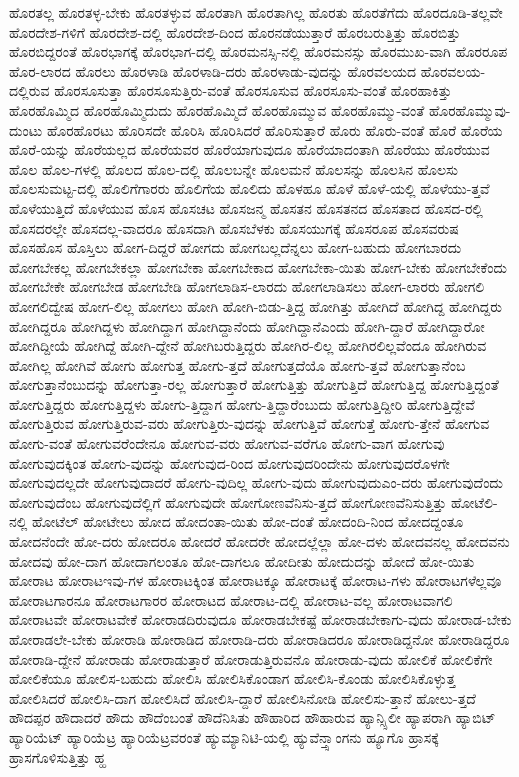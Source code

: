 {ಹೊರತಲ್ಲ
ಹೊರತಳ್ಳ-ಬೇಕು
ಹೊರತಳ್ಳುವ
ಹೊರತಾಗಿ
ಹೊರತಾಗಿಲ್ಲ
ಹೊರತು
ಹೊರತೆಗೆದು
ಹೊರದೂಡಿ-ತಲ್ಲವೇ
ಹೊರದೇಶ-ಗಳಿಗೆ
ಹೊರದೇಶ-ದಲ್ಲಿ
ಹೊರದೇಶ-ದಿಂದ
ಹೊರನಡೆಯುತ್ತಾರೆ
ಹೊರಬರುತ್ತಿತ್ತು
ಹೊರಬಿತ್ತು
ಹೊರಬಿದ್ದರಂತೆ
ಹೊರಭಾಗಕ್ಕೆ
ಹೊರಭಾಗ-ದಲ್ಲಿ
ಹೊರಮನಸ್ಸಿ-ನಲ್ಲಿ
ಹೊರಮನಸ್ಸು
ಹೊರಮುಖ-ವಾಗಿ
ಹೊರರೂಪ
ಹೊರ-ಲಾರದ
ಹೊರಲು
ಹೊರಳಾಡಿ
ಹೊರಳಾಡಿ-ದರು
ಹೊರಳಾಡು-ವುದನ್ನು
ಹೊರವಲಯದ
ಹೊರವಲಯ-ದಲ್ಲಿರುವ
ಹೊರಸೂಸುತ್ತಾ
ಹೊರಸೂಸುತ್ತಿರು-ವಂತೆ
ಹೊರಸೂಸುವ
ಹೊರಸೂಸು-ವಂತೆ
ಹೊರಹಾಕಿತ್ತು
ಹೊರಹೊಮ್ಮಿದ
ಹೊರಹೊಮ್ಮಿದುದು
ಹೊರಹೊಮ್ಮಿದೆ
ಹೊರಹೊಮ್ಮುವ
ಹೊರಹೊಮ್ಮು-ವಂತೆ
ಹೊರಹೊಮ್ಮುವು-ದುಂಟು
ಹೊರಹೊರಟು
ಹೊರಿಸದೇ
ಹೊರಿಸಿ
ಹೊರಿಸಿದರೆ
ಹೊರಿಸುತ್ತಾರೆ
ಹೊರು
ಹೊರು-ವಂತೆ
ಹೊರೆ
ಹೊರೆಯ
ಹೊರೆ-ಯನ್ನು
ಹೊರೆಯಲ್ಲದ
ಹೊರೆಯವರ
ಹೊರೆಯಾಗುವುದೂ
ಹೊರೆಯಾದಂತಾಗಿ
ಹೊರೆಯು
ಹೊರೆಯುವ
ಹೊಲ
ಹೊಲ-ಗಳಲ್ಲಿ
ಹೊಲದ
ಹೊಲ-ದಲ್ಲಿ
ಹೊಲಬನ್ನೇ
ಹೊಲಮನೆ
ಹೊಲಸನ್ನು
ಹೊಲಸಿನ
ಹೊಲಸು
ಹೊಲಸುಮಟ್ಟ-ದಲ್ಲಿ
ಹೊಲಿಗೆಗಾರರು
ಹೊಲಿಗೆಯ
ಹೊಲಿದು
ಹೊಳಹೂ
ಹೊಳೆ
ಹೊಳೆ-ಯಲ್ಲಿ
ಹೊಳೆಯು-ತ್ತವೆ
ಹೊಳೆಯುತ್ತಿದೆ
ಹೊಳೆಯುವ
ಹೊಸ
ಹೊಸಚಟ
ಹೊಸಜನ್ಮ
ಹೊಸತನ
ಹೊಸತನದ
ಹೊಸತಾದ
ಹೊಸದ-ರಲ್ಲಿ
ಹೊಸದರಲ್ಲೇ
ಹೊಸದಲ್ಲ-ವಾದರೂ
ಹೊಸದಾಗಿ
ಹೊಸಬೆಳಕು
ಹೊಸಯುಗಕ್ಕೆ
ಹೊಸರೂಪ
ಹೊಸವರುಷ
ಹೊಸಹೊಸ
ಹೊಸ್ತಿಲು
ಹೋಗ-ದಿದ್ದರೆ
ಹೋಗದು
ಹೋಗಬಲ್ಲದೆನ್ನಲು
ಹೋಗ-ಬಹುದು
ಹೋಗಬಾರದು
ಹೋಗಬೇಕಲ್ಲ
ಹೋಗಬೇಕಲ್ಲಾ
ಹೋಗಬೇಕಾ
ಹೋಗಬೇಕಾದ
ಹೋಗಬೇಕಾ-ಯಿತು
ಹೋಗ-ಬೇಕು
ಹೋಗಬೇಕೆಂದು
ಹೋಗಬೇಕೇ
ಹೋಗಬೇಡ
ಹೋಗಬೇಡಿ
ಹೋಗಲಾಡಿಸ-ಲಾರದು
ಹೋಗಲಾಡಿಸಲು
ಹೋಗ-ಲಾರರು
ಹೋಗಲಿ
ಹೋಗಲಿದ್ವೇಷ
ಹೋಗ-ಲಿಲ್ಲ
ಹೋಗಲು
ಹೋಗಿ
ಹೋಗಿ-ಬಿಡು-ತ್ತಿದ್ದ
ಹೋಗಿತ್ತು
ಹೋಗಿದೆ
ಹೋಗಿದ್ದ
ಹೋಗಿದ್ದರು
ಹೋಗಿದ್ದರೂ
ಹೋಗಿದ್ದಳು
ಹೋಗಿದ್ದಾಗ
ಹೋಗಿದ್ದಾನೆಂದು
ಹೋಗಿದ್ದಾನೆಎಂದು
ಹೋಗಿ-ದ್ದಾರೆ
ಹೋಗಿದ್ದಾರೋ
ಹೋಗಿದ್ದೀಯೆ
ಹೋಗಿದ್ದೆ
ಹೋಗಿ-ದ್ದೇನೆ
ಹೋಗಿಬರುತ್ತಿದ್ದರು
ಹೋಗಿರ-ಲಿಲ್ಲ
ಹೋಗಿರಲಿಲ್ಲವೆಂದೂ
ಹೋಗಿರುವ
ಹೋಗಿಲ್ಲ
ಹೋಗಿವೆ
ಹೋಗು
ಹೋಗುತ್ತ
ಹೋಗು-ತ್ತದೆ
ಹೋಗುತ್ತದೆಯೊ
ಹೋಗು-ತ್ತವೆ
ಹೋಗುತ್ತಾನೆಂಬ
ಹೋಗುತ್ತಾನೆಂಬುದನ್ನು
ಹೋಗುತ್ತಾ-ರಲ್ಲ
ಹೋಗುತ್ತಾರೆ
ಹೋಗುತ್ತಿತ್ತು
ಹೋಗುತ್ತಿದೆ
ಹೋಗುತ್ತಿದ್ದ
ಹೋಗುತ್ತಿದ್ದಂತೆ
ಹೋಗುತ್ತಿದ್ದರು
ಹೋಗುತ್ತಿದ್ದಳು
ಹೋಗು-ತ್ತಿದ್ದಾಗ
ಹೋಗು-ತ್ತಿದ್ದಾರೆಂಬುದು
ಹೋಗುತ್ತಿದ್ದೀರಿ
ಹೋಗುತ್ತಿದ್ದೇವೆ
ಹೋಗುತ್ತಿರುವ
ಹೋಗುತ್ತಿರುವ-ವರು
ಹೋಗುತ್ತಿರು-ವುದನ್ನು
ಹೋಗುತ್ತಿವೆ
ಹೋಗುತ್ತೆ
ಹೋಗು-ತ್ತೇನೆ
ಹೋಗುವ
ಹೋಗು-ವಂತೆ
ಹೋಗುವರೆಂದೇನೂ
ಹೋಗುವ-ವರು
ಹೋಗುವ-ವರೆಗೂ
ಹೋಗು-ವಾಗ
ಹೋಗುವು
ಹೋಗುವುದಕ್ಕಿಂತ
ಹೋಗು-ವುದನ್ನು
ಹೋಗುವುದ-ರಿಂದ
ಹೋಗುವುದರಿಂದೇನು
ಹೋಗುವುದರೊಳಗೇ
ಹೋಗುವುದಲ್ಲದೇ
ಹೋಗುವುದಾದರೆ
ಹೋಗು-ವುದಿಲ್ಲ
ಹೋಗು-ವುದು
ಹೋಗುವುದುಎಂ-ದರು
ಹೋಗುವುದೆಂದು
ಹೋಗುವುದೆಂಬ
ಹೋಗುವುದೆಲ್ಲಿಗೆ
ಹೋಗುವುದೇ
ಹೋಗೋಣವೆನಿಸು-ತ್ತದೆ
ಹೋಗೋಣವೆನಿಸುತ್ತಿತ್ತು
ಹೋಟೆಲಿ-ನಲ್ಲಿ
ಹೋಟೆಲ್
ಹೋಟೇಲು
ಹೋದ
ಹೋದಂತಾ-ಯಿತು
ಹೋ-ದಂತೆ
ಹೋದಂದಿ-ನಿಂದ
ಹೋದದ್ದಂತೂ
ಹೋದನೆಂದೇ
ಹೋ-ದರು
ಹೋದರೂ
ಹೋದರೆ
ಹೋದರೇ
ಹೋದಲ್ಲೆಲ್ಲಾ
ಹೋ-ದಳು
ಹೋದವನಲ್ಲ
ಹೋದವನು
ಹೋದವು
ಹೋ-ದಾಗ
ಹೋದಾಗಲಂತೂ
ಹೋ-ದಾಗಲೂ
ಹೋದೀತು
ಹೋದುದನ್ನು
ಹೋದೆ
ಹೋ-ಯಿತು
ಹೋರಾಟ
ಹೋರಾಟಇವು-ಗಳ
ಹೋರಾಟಕ್ಕಿಂತ
ಹೋರಾಟಕ್ಕೂ
ಹೋರಾಟಕ್ಕೆ
ಹೋರಾಟ-ಗಳು
ಹೋರಾಟಗಳೆಲ್ಲವೂ
ಹೋರಾಟಗಾರನೂ
ಹೋರಾಟಗಾರರ
ಹೋರಾಟದ
ಹೋರಾಟ-ದಲ್ಲಿ
ಹೋರಾಟ-ವಲ್ಲ
ಹೋರಾಟವಾಗಲಿ
ಹೋರಾಟವೇ
ಹೋರಾಟವೇಕೆ
ಹೋರಾಡದಿರುವುದೂ
ಹೋರಾಡಬೇಕಷ್ಟೆ
ಹೋರಾಡಬೇಕಾಗು-ವುದು
ಹೋರಾಡ-ಬೇಕು
ಹೋರಾಡಲೇ-ಬೇಕು
ಹೋರಾಡಿ
ಹೋರಾಡಿದ
ಹೋರಾಡಿ-ದರು
ಹೋರಾಡಿದರೂ
ಹೋರಾಡಿದ್ದನೋ
ಹೋರಾಡಿದ್ದರೂ
ಹೋರಾಡಿ-ದ್ದೇನೆ
ಹೋರಾಡು
ಹೋರಾಡುತ್ತಾರೆ
ಹೋರಾಡುತ್ತಿರುವನೊ
ಹೋರಾಡು-ವುದು
ಹೋಲಿಕೆ
ಹೋಲಿಕೆಗೇ
ಹೋಲಿಕೆಯೂ
ಹೋಲಿಸ-ಬಹುದು
ಹೋಲಿಸಿ
ಹೋಲಿಸಿಕೊಂಡಾಗ
ಹೋಲಿಸಿ-ಕೊಂಡು
ಹೋಲಿಸಿಕೊಳ್ಳುತ್ತ
ಹೋಲಿಸಿದರೆ
ಹೋಲಿಸಿ-ದಾಗ
ಹೋಲಿಸಿದೆ
ಹೋಲಿಸಿ-ದ್ದಾರೆ
ಹೋಲಿಸಿನೋಡಿ
ಹೋಲಿಸು-ತ್ತಾನೆ
ಹೋಲು-ತ್ತದೆ
ಹೌದಪ್ಪರ
ಹೌದಾದರೆ
ಹೌದು
ಹೌದೆಂಬಂತೆ
ಹೌದೆನಿಸಿತು
ಹೌಹಾರಿದ
ಹೌಹಾರುವ
ಹ್ಯಾನ್ಸ್ಸಿಲೀ
ಹ್ಯಾಪರಾಗಿ
ಹ್ಯಾಬಿಟ್
ಹ್ಯಾರಿಯೆಟ್
ಹ್ಯಾರಿಯೆಟ್ರ
ಹ್ಯಾರಿಯೆಟ್ರವರಂತೆ
ಹ್ಯುಮ್ಯಾನಿಟಿ-ಯಲ್ಲಿ
ಹ್ಯುವೆನ್ತ್ಸಾಂಗನು
ಹ್ಯೂಗೊ
ಹ್ರಾಸಕ್ಕೆ
ಹ್ರಾಸಗೊಳಿಸುತ್ತಿತ್ತು
ಹ್ಹ
}
